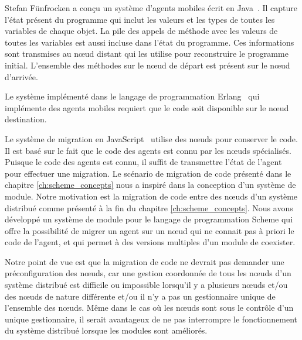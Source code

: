 Stefan Fünfrocken a conçu un système d'agents mobiles écrit en
Java~\cite{And98transparentmigration}. Il capture l'état présent du programme
qui inclut les valeurs et les types de toutes les variables de chaque objet.
La pile des appels de méthode avec les valeurs de toutes les variables est
aussi incluse dans l'état du programme.  Ces informations sont transmises au
nœud distant qui les utilise pour reconstruire le programme initial.
L'ensemble des méthodes sur le nœud de départ est présent sur le nœud
d'arrivée.

Le système implémenté dans le langage de programmation
Erlang~\cite{M_mobileintelligent} qui implémente des agents mobiles requiert
que le code soit disponible sur le nœud destination.

Le système de migration en JavaScript~\cite{DEV2017transparentmigration}
utilise des nœuds pour conserver le code. Il est basé sur le fait que le code
des agents est connu par les nœuds spécialisés. Puisque le code des agents est
connu, il suffit de transmettre l'état de l'agent pour effectuer une migration.
Le scénario de migration de code présenté dans le chapitre
\ref{ch:scheme_concepts} nous a inspiré dans la conception d'un système de
module.
Notre motivation est la migration de code entre des nœuds d'un système
distribué comme présenté à la fin du chapitre \ref{ch:scheme_concepts}.  Nous
avons développé un système de module pour le langage de programmation Scheme
qui offre la possibilité de migrer un agent sur un nœud qui ne connait pas à
priori le code de l'agent, et qui permet à des versions multiples d'un module
de coexister.

Notre point de vue est que la migration de code ne devrait pas
demander une préconfiguration des nœuds, car une gestion coordonnée de
tous les nœuds d'un système distribué est difficile ou impossible
lorsqu'il y a plusieurs nœuds et/ou des nœuds de nature différente
et/ou il n'y a pas un gestionnaire unique de l'ensemble des nœuds.
Même dans le cas où les nœuds sont sous le contrôle d'un unique
gestionnaire, il serait avantageux de ne pas interrompre le
fonctionnement du système distribué lorsque les modules sont
améliorés.

